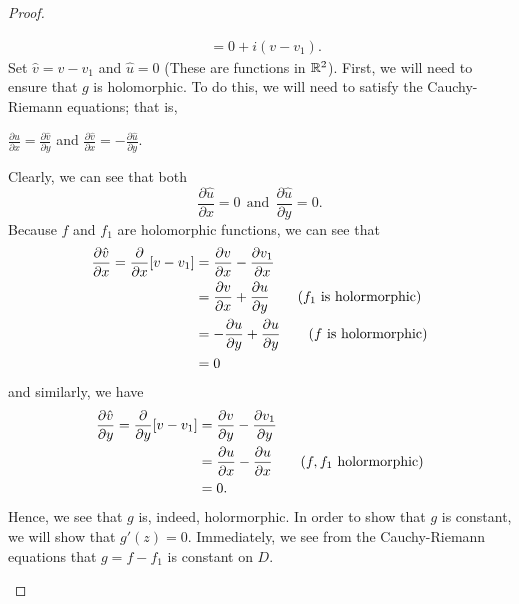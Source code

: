 \documentclass[a4paper]{article}
\begin{document}
\begin{proof}
\begin{enumerate}
\begin{align*}
                            &= 0 + i (v - {v}_{1}).
        \end{align*}
        Set \( \hat{v} = v - {v}_{1} \) and \( \hat{u} = 0  \) (These are functions in \( \mathbb{R}^{2} \)). First, we will need to ensure that \( g  \) is holomorphic. To do this, we will need to satisfy the Cauchy-Riemann equations; that is,
        \begin{center}
            \( \displaystyle \frac{\partial \hat{u} }{\partial x }  = \displaystyle \frac{\partial \hat{v} }{\partial y }  \) and \( \displaystyle \frac{\partial \hat{v} }{\partial x }  = \displaystyle - \frac{\partial \hat{u} }{\partial y }  \).
        \end{center}
        Clearly, we can see that both 
        \[ \frac{\partial \hat{u} }{\partial x  }  = 0 \ \ \text{and} \ \ \frac{\partial \hat{u} }{\partial y } = 0. \tag{1}  \]
        Because \( f  \) and \( {f}_{1} \) are holomorphic functions, we can see that 
        \begin{align*}
            \frac{\partial \hat{v} }{\partial x  }  = \frac{\partial  }{\partial x }  [ v - {v}_{1}] 
                                                    &=  \frac{\partial v }{\partial x }  - \frac{\partial {v}_{1} }{\partial x }  \\ 
                                                    &= \frac{\partial v }{\partial x }  + \frac{\partial u }{\partial y }  \tag{\( {f}_{1} \) is holormorphic}\\ 
                                                    &=  - \frac{\partial u }{\partial y } + \frac{\partial u }{\partial y } \tag{\( f \) is holormorphic} \\
                                                    &= 0
        \end{align*}
        and similarly, we have
        \begin{align*}
            \frac{\partial \hat{v} }{\partial y }  = \frac{\partial  }{\partial y } [v - {v}_{1}] &= \frac{\partial v }{\partial y }  - \frac{\partial {v}_{1} }{\partial y }  \\
                                                                                                  &= \frac{\partial u }{\partial x }  - \frac{\partial u }{\partial x } \tag{\( f, {f}_{1} \) holormorphic} \\
                                                                                                  &= 0.
        \end{align*}
        Hence, we see that \( g  \) is, indeed, holormorphic.
        In order to show that \( g  \) is constant, we will show that \( g'(z) = 0 \). Immediately, we see from the Cauchy-Riemann equations that \( g = f - {f}_{1} \) is constant on \( D  \).

            
    \end{enumerate}
\end{proof}
\end{document}
